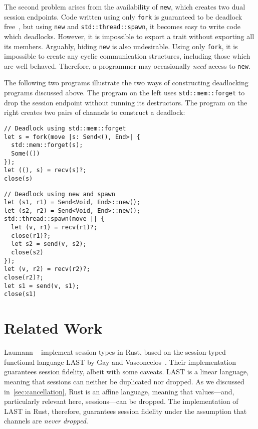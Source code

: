 \documentclass[copyright,creativecommons]{eptcs}
\begin{document}
The second problem arises from the availability of \lstinline{new}, which creates two dual session endpoints. Code written using only \lstinline{fork} is guaranteed to be deadlock free~\cite{lindley2015}, but using \lstinline{new} and \lstinline{std::thread::spawn}, it becomes easy to write code which deadlocks. However, it is impossible to export a trait without exporting all its members. Arguably, hiding \lstinline{new} is also undesirable. Using only \lstinline{fork}, it is impossible to create any cyclic communication structures, including those which are well behaved. Therefore, a programmer may occasionally \emph{need} access to \lstinline{new}.

The following two programs illustrate the two ways of constructing deadlocking programs discussed above. The program on the left uses \lstinline{std::mem::forget} to drop the session endpoint without running its destructors. The program on the right creates two pairs of channels to construct a deadlock:
\vspace{-0.5\baselineskip}
\begin{minipage}[t]{0.5\linewidth}
\begin{lstlisting}
// Deadlock using std::mem::forget
let s = fork(move |s: Send<(), End>| {
  std::mem::forget(s);
  Some(())
});
let ((), s) = recv(s)?;
close(s)
\end{lstlisting}
\end{minipage}%
\begin{minipage}[t]{0.5\linewidth}
\begin{lstlisting}
// Deadlock using new and spawn
let (s1, r1) = Send<Void, End>::new();
let (s2, r2) = Send<Void, End>::new();
std::thread::spawn(move || {
  let (v, r1) = recv(r1)?;
  close(r1)?;
  let s2 = send(v, s2);
  close(s2)
});
let (v, r2) = recv(r2)?;
close(r2)?;
let s1 = send(v, s1);
close(s1)
\end{lstlisting}
\end{minipage}
\vspace{-0.25\baselineskip}

\section{Related Work}\label{sec:related-work}
Laumann \etal~\cite{jespersen2015} implement session types in Rust, based on the session-typed functional language LAST by Gay and Vasconcelos~\cite{gay2009}. Their implementation guarantees session fidelity, albeit with some caveats. LAST is a linear language, meaning that sessions can neither be duplicated nor dropped. As we discussed in~\cref{sec:cancellation}, Rust is an affine language, meaning that values---and, particularly relevant here, sessions---can be dropped. The implementation of LAST in Rust, therefore, guarantees session fidelity under the assumption that channels are \emph{never dropped}.
\end{document}
